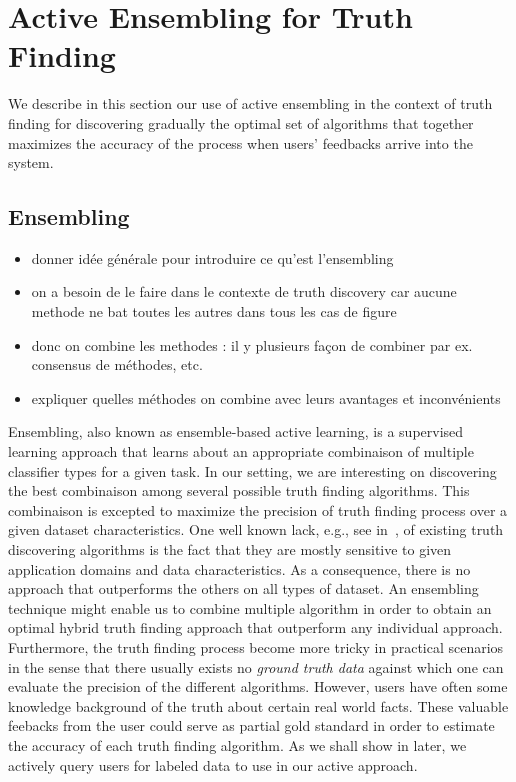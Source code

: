 \section{Active Ensembling for Truth Finding}
We describe in this section our use of active ensembling in the context of truth finding
for discovering gradually the optimal set of algorithms that together maximizes the accuracy
of the process when users' feedbacks arrive into the system.

\subsection{Ensembling }
\begin{itemize}
\item donner idée générale pour introduire  ce qu'est l'ensembling
\item on a besoin de le faire dans le contexte de truth discovery car aucune methode ne bat toutes les autres dans tous les cas de figure
\item donc on combine les methodes : il y plusieurs façon de combiner par ex. consensus de méthodes, etc.
\item expliquer quelles méthodes on combine avec leurs avantages et inconvénients
\end{itemize}


Ensembling, also known as ensemble-based active learning, is a supervised learning approach that learns
about an appropriate combinaison of multiple classifier types for a given task. In our setting, we are interesting
on discovering the best combinaison among several possible truth finding algorithms. This combinaison is excepted 
to maximize the precision of truth finding process over a given dataset characteristics.
One well known lack, e.g., see in~\cite{Li12, Wagui14}, of existing truth discovering algorithms is the fact that
they are mostly sensitive to given application domains and data characteristics. As a consequence, there is no approach 
that outperforms the others on all types of dataset.  An ensembling technique might enable  us to combine multiple algorithm
in order to obtain an optimal hybrid truth finding approach that outperform any individual approach. Furthermore, the truth
finding process become more tricky in practical scenarios in the sense that there usually exists no \emph{ground truth data}
against which one can evaluate the precision of the different algorithms. However, users have often some knowledge background
of the truth about certain real world facts. These valuable feebacks from the user could serve as partial gold standard in order
to estimate the accuracy of each truth finding algorithm.  As we shall show in later, we actively query users for labeled data to 
use in our active approach.

